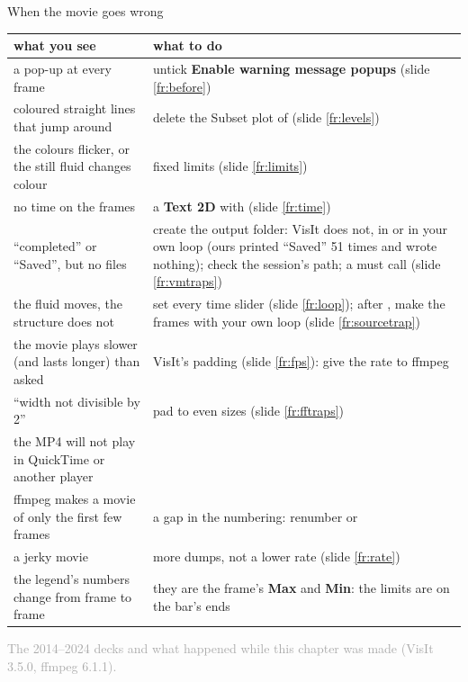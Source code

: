 \documentclass[aspectratio=169,11pt]{beamer}
\newcommand{\sourcecredit}[1]{\vfill\begin{flushright}\tiny\textcolor{DarkGray}{#1}\end{flushright}}
\newcommand{\gui}[1]{\textsf{\textbf{#1}}}
\begin{document}
\begin{frame}{When the movie goes wrong}
\label{fr:trouble}
\scriptsize
\begin{tabular}{@{}L{0.4\textwidth}L{0.55\textwidth}@{}}
\toprule
what you see & what to do \\
\midrule
a pop-up at every frame & untick \gui{Enable warning message popups} (slide \ref{fr:before}) \\
coloured straight lines that jump around & delete the Subset plot of  (slide \ref{fr:levels}) \\
the colours flicker, or the still fluid changes colour & fixed limits (slide \ref{fr:limits}) \\
no time on the frames & a \gui{Text 2D} with  (slide \ref{fr:time}) \\
``completed'' or ``Saved'', but no files & create the output folder: VisIt does not, in  or in your own loop (ours printed ``Saved'' 51 times and wrote nothing); check the session's path; a  must call  (slide \ref{fr:vmtraps}) \\
the fluid moves, the structure does not & set every time slider (slide \ref{fr:loop}); after , make the frames with your own loop (slide \ref{fr:sourcetrap}) \\
the movie plays slower (and lasts longer) than asked & VisIt's padding (slide \ref{fr:fps}): give the rate to ffmpeg \\
``width not divisible by 2'' & pad to even sizes (slide \ref{fr:fftraps}) \\
the MP4 will not play in QuickTime or another player &  \\
ffmpeg makes a movie of only the first few frames & a gap in the numbering: renumber or  \\
a jerky movie & more dumps, not a lower rate (slide \ref{fr:rate}) \\
the legend's numbers change from frame to frame & they are the frame's \gui{Max} and \gui{Min}: the limits are on the bar's ends \\
\bottomrule
\end{tabular}
\sourcecredit{The 2014--2024 decks and what happened while this chapter was made (VisIt 3.5.0, ffmpeg 6.1.1).}
\end{frame}
\end{document}
